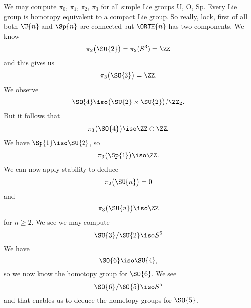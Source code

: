 We may compute $\pi_0$, $\pi_1$, $\pi_2$, $\pi_3$ for all simple
Lie groups $\mathrm{U}$, $\mathrm{O}$, $\mathrm{Sp}$. Every Lie
group is homotopy equivalent to a compact Lie group. So really,
look, first of all both $\U{n}$ and $\Sp{n}$ are connected but
$\ORTH{n}$ has two components. We know
\begin{equation}
\pi_{3}\bigl(\SU{2}\bigr)=\pi_{3}(S^3)=\ZZ
\end{equation}
and this gives us
\begin{equation}
\pi_{3}\bigl(\SO{3}\bigr)=\ZZ.
\end{equation}
We observe
\begin{equation}
\SO{4}\iso\bigl(\SU{2}\times\SU{2}\bigr)/\ZZ_2.
\end{equation}
But it follows that
\begin{equation}
\pi_{3}\bigl(\SO{4}\bigr)\iso\ZZ\oplus\ZZ.
\end{equation}
We have $\Sp{1}\iso\SU{2}$, so
\begin{equation}
\pi_{3}\bigl(\Sp{1}\bigr)\iso\ZZ.
\end{equation}
We can now apply stability to deduce
\begin{equation}
\pi_{2}\bigl(\SU{n}\bigr)=0
\end{equation}
and
\begin{equation}
\pi_{3}\bigl(\SU{n}\bigr)\iso\ZZ
\end{equation}
for $n\geq2$. We see we may compute
\begin{equation}
\SU{3}/\SU{2}\iso S^5
\end{equation}
We have
\begin{equation}
\SO{6}\iso\SU{4},
\end{equation}
so we now know the homotopy group for $\SO{6}$. We see
\begin{equation}
\SO{6}/\SO{5}\iso S^5
\end{equation}
and that enables us to deduce the homotopy groups for $\SO{5}$.


